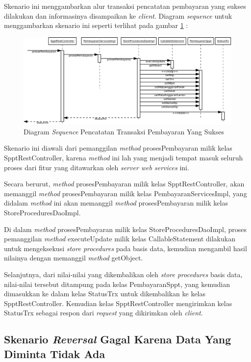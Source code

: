 Skenario ini menggambarkan alur transaksi pencatatan pembayaran yang sukses dilakukan dan informasinya disampaikan ke \textit{client}. Diagram \textit{sequence} untuk menggambarkan skenario ini seperti terlihat pada gambar \ref{fig:uml-seq-trx} :

\begin{figure}[H]
  \centering
  \includegraphics[width=1\textwidth]{./resources/uml/uml-seq-trx}
  \caption{Diagram \textit{Sequence} Pencatatan Transaksi Pembayaran Yang Sukses}
  \label{fig:uml-seq-trx}
\end{figure}

Skenario ini diawali dari pemanggilan \textit{method} prosesPembayaran milik kelas SpptRestController, karena \textit{method} ini lah yang menjadi tempat masuk seluruh proses dari fitur yang ditawarkan oleh \textit{server web services} ini.

Secara berurut, \textit{method} prosesPembayaran milik kelas SpptRestController, akan memanggil \textit{method} prosesPembayaran milik kelas PembayaranServicesImpl, yang didalam \textit{method} ini akan memanggil \textit{method} prosesPembayaran milik kelas StoreProceduresDaoImpl.

Di dalam \textit{method} prosesPembayaran milik kelas StoreProceduresDaoImpl, proses pemanggilan \textit{method} executeUpdate milik kelas CallableStatement dilakukan untuk mengeksekusi \textit{store procedures} pada basis data, kemudian mengambil hasil nilainya dengan memanggil \textit{method} getObject.

Selanjutnya, dari nilai-nilai yang dikembalikan oleh \textit{store procedures} basis data, nilai-nilai tersebut ditampung pada kelas PembayaranSppt, yang kemudian dimasukkan ke dalam kelas StatusTrx untuk dikembalikan ke kelas SpptRestController. Kemudian kelas SpptRestController mengirimkan kelas StatusTrx sebagai respon dari \textit{request} yang dikirimkan oleh \textit{client}.

\subsection{Skenario \textit{Reversal} Gagal Karena Data Yang Diminta Tidak Ada}
